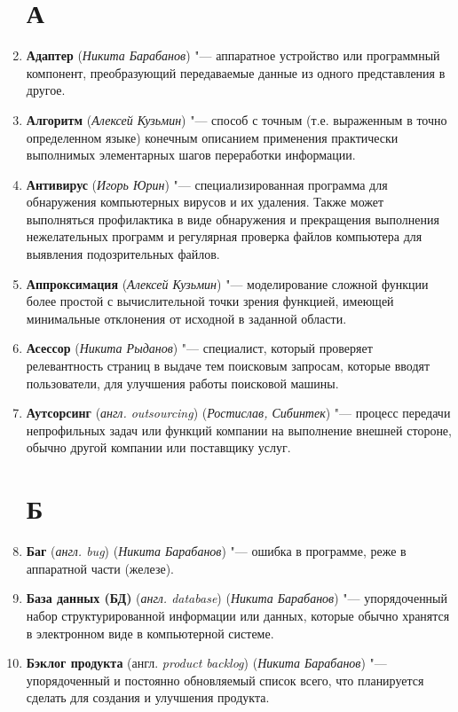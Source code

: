 \documentclass[14pt]{extarticle}
\begin{document}
\begin{enumerate}
    \section*{А}
    \item \textbf{Адаптер} (\textit{Никита Барабанов}) "--- аппаратное устройство или программный компонент, преобразующий передаваемые данные из одного представления в другое.
    \item \textbf{Алгоритм} (\textit{Алексей Кузьмин}) "--- способ с точным (т.е. выраженным в точно
    определенном языке) конечным описанием применения практически выполнимых элементарных шагов переработки информации.
    \item \textbf{Антивирус} (\textit{Игорь Юрин}) "--- специализированная программа для обнаружения компьютерных вирусов и их удаления. Также может выполняться профилактика в виде обнаружения и прекращения выполнения нежелательных программ и регулярная проверка файлов компьютера для выявления подозрительных файлов.
    \item \textbf{Аппроксимация}  (\textit{Алексей Кузьмин}) "--- моделирование сложной функции более простой с вычислительной точки зрения функцией,
    имеющей минимальные отклонения от исходной в заданной области.
    \item \textbf{Асессор} (\textit{Никита Рыданов}) "--- специалист, который проверяет релевантность страниц в выдаче тем поисковым запросам, которые вводят пользователи, для улучшения работы поисковой машины.
    \item \textbf{Аутсорсинг} (\textit{англ. outsourcing}) (\textit{Ростислав, Сибинтек}) "--- процесс передачи непрофильных задач или функций компании на выполнение внешней стороне, обычно другой компании или поставщику услуг.
    \section*{Б}
    \item \textbf{Баг} (\textit{англ. bug}) (\textit{Никита Барабанов}) "--- ошибка в программе, реже в аппаратной части (железе).
    \item \textbf{База данных (БД)} (\textit{англ. database}) (\textit{Никита Барабанов}) "--- упорядоченный набор структурированной информации или данных, которые обычно хранятся в электронном виде в компьютерной системе.
    \item \textbf{Бэклог продукта} (англ. \textit{product backlog}) (\textit{Никита Барабанов}) "--- 
    упорядоченный и постоянно обновляемый список всего, что планируется сделать для создания и улучшения продукта.

\end{enumerate}
\end{document}
